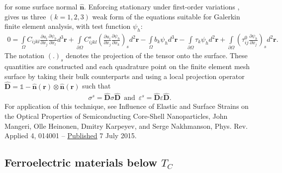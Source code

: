 \documentclass[22pt]{article} %
\begin{document}
%
for some surface normal $\mathbf{\hat{n}}$.
%
Enforcing stationary under first-order variations \cite{BowerBook}, gives us three $(k = 1,2,3)$ weak form of the equations suitable for Galerkin finite element analysis, with test function $\psi_h$:
%
\begin{align}\tag{6}
 0 = \int\limits_\Omega C_{ijkl} \frac{\partial u_i}{\partial x_j} \frac{\partial \psi_h}{\partial x_l} d^3 \textbf{r} + \int\limits_{\partial \Omega} C_{ijkl}^s \left(\frac{\partial u_i}{\partial x_j} \frac{\partial \psi_h}{\partial x_k} \right)_s d^2 \textbf{r} - \int\limits_\Omega b_k \psi_h d^3 \textbf{r} - \int\limits_{\partial \Omega} \tau_k \psi_h d^2 \textbf{r} + \int\limits_{\partial \Omega} \left(\tau_{ij}^0 \frac{\partial \psi_h}{\partial x_j} \right)_s d^2 \textbf{r}.
\end{align}
%
The notation $\left( . \right)_s$ denotes the projection of the tensor onto the surface.
%
These quantities are constructed and each quadrature point on the finite element mesh surface by taking their bulk counterparts and using a local projection operator $\mathbf{\hat{\textbf{D}}} = \mathds{1} - \mathbf{\hat{n}}(\textbf{r}) \otimes \mathbf{\hat{n}} (\textbf{r})$ \cite{Yvonnet2012} such that 
%
\begin{align}\tag{7}
\sigma^s = \mathbf{\hat{\textbf{D}}} \sigma \mathbf{\hat{\textbf{D}}} \,\,\,\mathrm{and}\,\,\, \varepsilon^s = \mathbf{\hat{\textbf{D}}} \varepsilon \mathbf{\hat{\textbf{D}}}.
\end{align}
%
For application of this technique, see Influence of Elastic and Surface Strains on the Optical Properties of Semiconducting Core-Shell Nanoparticles,
John Mangeri, Olle Heinonen, Dmitry Karpeyev, and Serge Nakhmanson, Phys. Rev. Applied 4, 014001 -- \href{http://journals.aps.org/prapplied/abstract/10.1103/PhysRevApplied.4.014001}{Published}  7 July 2015. 
%

%
\subsection{Ferroelectric materials below $T_C$}
%

%
\end{document}
